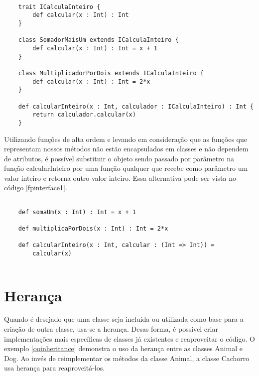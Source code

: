 
\begin{lstlisting}[caption={Interfaces em Orientação a Objetos},label=oopinterface1]
    
    trait ICalculaInteiro {
        def calcular(x : Int) : Int
    }

    class SomadorMaisUm extends ICalculaInteiro {
        def calcular(x : Int) : Int = x + 1
    }

    class MultiplicadorPorDois extends ICalculaInteiro {
        def calcular(x : Int) : Int = 2*x
    }

    def calcularInteiro(x : Int, calculador : ICalculaInteiro) : Int {
        return calculador.calcular(x)
    }

\end{lstlisting}

Utilizando funções de alta ordem e levando em 
consideração que as funções que representam nossos 
métodos não estão encapsulados em classes e 
não dependem de atributos, é possível substituir o 
objeto sendo passado por parâmetro na função 
calcularInteiro por uma função qualquer que recebe 
como parâmetro um valor inteiro e retorna outro 
valor inteiro. Essa alternativa pode ser vista 
no código \ref{fpinterface1}.

\begin{lstlisting}[caption={Interfaces em Programação Funcional},label=fpinterface1]
    
    def somaUm(x : Int) : Int = x + 1

    def multiplicaPorDois(x : Int) : Int = 2*x

    def calcularInteiro(x : Int, calcular : (Int => Int)) =
        calcular(x)
    
\end{lstlisting}



\section{Herança}

Quando é desejado que uma classe seja incluída ou 
utilizada como base para a criação de outra classe, 
usa-se a herança\cite{quarkoo}. Desas forma, é 
possível criar implementações mais específicas 
de classes já existentes e reaproveitar o código. 
O exemplo \ref{ooinheritance} demonstra 
o uso da herança entre as classes Animal e Dog. 
Ao invés de reimplementar os métodos da classe 
Animal, a classe Cachorro usa herança para reaproveitá-los. 

